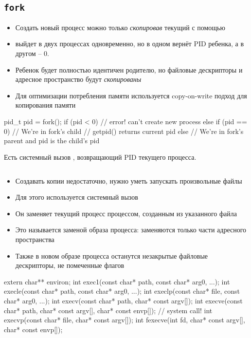   \subsection{\texttt{fork}}
    \begin{itemize}
      \item Создать новый процесс можно только \textit{скопировав} текущий с помощью 
      \item {} выйдет в двух процессах одновременно, но в одном вернёт PID ребенка, а в другом -- 0.
      \item Ребенок будет полностью идентичен родителю, но файловые дескрипторы и адресное пространство будут \textit{скопированы}
      \item Для оптимизации потребления памяти используется copy-on-write подход для копирования памяти 
    \end{itemize}
\begin{cminted}
pid_t pid = fork();
if (pid < 0) {
  // error! can't create new process
} else if (pid == 0) {
  // We're in fork's child
  // getpid() returns current pid
} else {
  // We're in fork's parent and pid is the child's pid
}
\end{cminted}
Есть системный вызов , возвращающий PID текущего процесса.

  \subsection{}
    \begin{itemize}
      \item Создавать копии недостаточно, нужно уметь запускать произвольные файлы
      \item Для этого используется системный вызов 
      \item Он заменяет текущий процесс процессом, созданным из указанного файла
      \item Это называется заменой образа процесса: заменяются только части адресного пространства 
      \item Также в новом образе процесса останутся незакрытые файловые дескрипторы, не помеченные флагов 
    \end{itemize}

\begin{cminted}
extern char** environ;
int exec1(const char* path, const char* arg0, ...);
int execle(const char* path, const char* arg0, ...);
int execlp(const char* file, const char* arg0, ...);
int execv(const char* path, char* const argv[]);
int execve(const char* path, char* const argv[],
           char* const envp[]);  // system call!
int execvp(const char* file, char* const argv[]);
int fexecve(int fd, char* const argv[], char* const envp[]);
\end{cminted}

